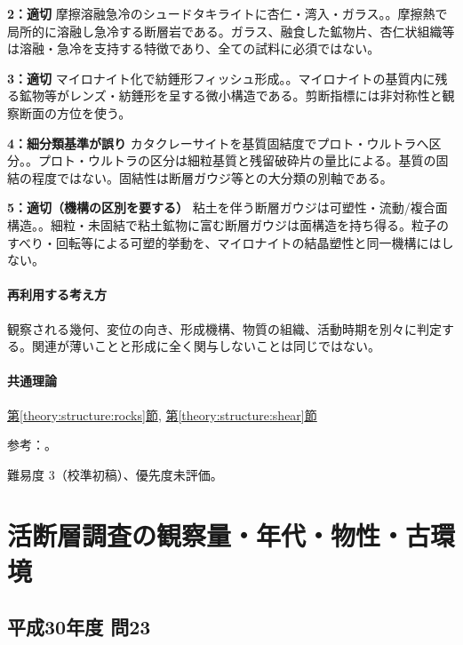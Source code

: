 \noindent\textbf{2：適切} 摩擦溶融急冷のシュードタキライトに杏仁・湾入・ガラス。。摩擦熱で局所的に溶融し急冷する断層岩である。ガラス、融食した鉱物片、杏仁状組織等は溶融・急冷を支持する特徴であり、全ての試料に必須ではない。\par

\noindent\textbf{3：適切} マイロナイト化で紡錘形フィッシュ形成。。マイロナイトの基質内に残る鉱物等がレンズ・紡錘形を呈する微小構造である。剪断指標には非対称性と観察断面の方位を使う。\par

\noindent\textbf{4：細分類基準が誤り} カタクレーサイトを基質固結度でプロト・ウルトラへ区分。。プロト・ウルトラの区分は細粒基質と残留破砕片の量比による。基質の固結の程度ではない。固結性は断層ガウジ等との大分類の別軸である。\par

\noindent\textbf{5：適切（機構の区別を要する）} 粘土を伴う断層ガウジは可塑性・流動/複合面構造。。細粒・未固結で粘土鉱物に富む断層ガウジは面構造を持ち得る。粒子のすべり・回転等による可塑的挙動を、マイロナイトの結晶塑性と同一機構にはしない。\par

\paragraph{再利用する考え方} 観察される幾何、変位の向き、形成機構、物質の組織、活動時期を別々に判定する。関連が薄いことと形成に全く関与しないことは同じではない。

\paragraph{共通理論} \hyperref[theory:structure:rocks]{第\ref*{theory:structure:rocks}節}, \hyperref[theory:structure:shear]{第\ref*{theory:structure:shear}節}

\par 参考：\cite{str_faultrocks,str_shear}。

\par 難易度 3（校準初稿）、優先度未評価。

\section{活断層調査の観察量・年代・物性・古環境}

\subsection{平成30年度 問23}
\label{q:h30-reg-applied-23}

